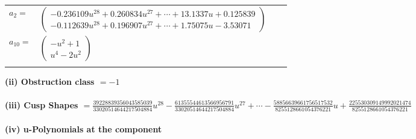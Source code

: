 \documentclass[1p]{elsarticle_modified}
\theoremstyle{definition}
\begin{document}
\begin{tabular}{m{7pt} m{180pt} m{7pt} m{180pt} }
\flushright $a_{2}=$&$\begin{pmatrix}-0.236109 u^{28}+0.260834 u^{27}+\cdots+13.1337 u+0.125839\\-0.112639 u^{28}+0.196907 u^{27}+\cdots+1.75075 u-3.53071\end{pmatrix}$ \\
\flushright $a_{10}=$&$\begin{pmatrix}- u^2+1\\u^4-2 u^2\end{pmatrix}$\\&\end{tabular}
\flushleft \textbf{(ii) Obstruction class $= -1$}\\~\\
\flushleft \textbf{(iii) Cusp Shapes $= \frac{39228839356043585039}{33020514644217504884} u^{28}-\frac{61355544613566956791}{33020514644217504884} u^{27}+\cdots-\frac{58856639661756517532}{8255128661054376221} u+\frac{225530309149992021474}{8255128661054376221}$}\\~\\
\newpage\renewcommand{\arraystretch}{1}
\flushleft \textbf{(iv) u-Polynomials at the component}\newline \\
\end{document}
